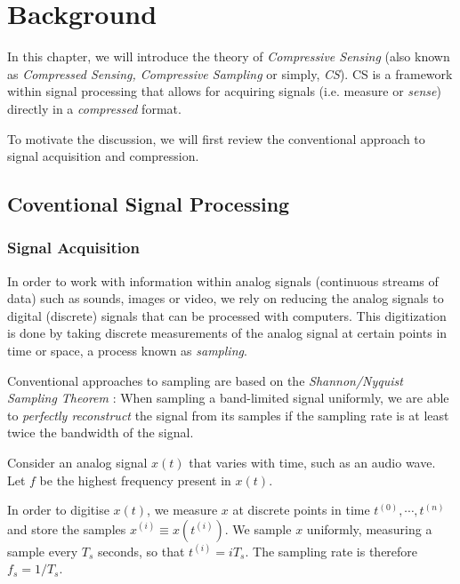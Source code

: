 \chapter{Background}
\label{ch:cs}
In this chapter, we will introduce the theory of \emph{Compressive Sensing} (also known as \emph{Compressed Sensing, Compressive Sampling} or simply, \emph{CS}).
CS is a framework within signal processing that allows for acquiring signals (i.e. measure or \emph{sense}) directly in a \emph{compressed} format.

To motivate the discussion, we will first review the conventional approach to signal acquisition and compression.

\section{Coventional Signal Processing}
\subsection{Signal Acquisition}
In order to work with information within analog signals (continuous streams of data) such as sounds, images or video, we rely on reducing the analog signals to digital (discrete) signals that can be processed with computers.
This digitization is done by taking discrete measurements of the analog signal at certain points in time or space, a process known as \emph{sampling}.

Conventional approaches to sampling are based on the \emph{Shannon/Nyquist Sampling Theorem} \cite{shannon1949}:
When sampling a band-limited signal uniformly, we are able to \emph{perfectly reconstruct} the signal from its samples if the sampling rate is at least twice the bandwidth of the signal.

Consider an analog signal $x(t)$ that varies with time, such as an audio wave.
Let $f$ be the highest frequency present in $x(t)$.

In order to digitise $x(t)$, we measure $x$ at discrete points in time $t^{(0)}, \cdots, t^{(n)}$ and store the samples $x^{(i)} \equiv x(t^{(i)})$.
We sample $x$ uniformly, measuring a sample every $T_s$ seconds, so that $t^{(i)} = iT_s$.
The sampling rate is therefore $f_s = 1/T_s$.

